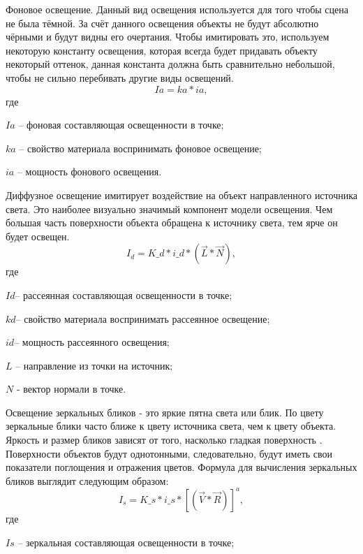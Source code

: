 \documentclass[a4paper,14pt]{report}
\begin{document}
Фоновое освещение. Данный вид освещения используется для того чтобы сцена не была тёмной. За счёт данного освещения объекты не будут абсолютно чёрными и будут видны его очертания. Чтобы имитировать это, используем некоторую константу освещения, которая всегда будет придавать объекту некоторый оттенок, данная константа должна быть сравнительно небольшой, чтобы не сильно перебивать другие виды освещений.
\begin{equation}
Ia = ka * ia ,
\label{eq4:ref}                  
\end{equation}                                             
где

$Ia$ – фоновая составляющая освещенности в точке;

$ka$ – свойство материала воспринимать фоновое освещение;

$ia$ – мощность фонового освещения.


Диффузное освещение имитирует воздействие на объект направленного источника света. Это наиболее визуально значимый компонент модели освещения. Чем большая часть поверхности объекта обращена к источнику света, тем ярче он будет освещен.
\begin{equation}
I_d=K\_d* i\_d*(\vec{L} * \vec{N}),  
\label{eq3:ref}                  
\end{equation}                                 
где

$Id$– рассеянная составляющая освещенности в точке;

$kd$– свойство материала воспринимать рассеянное освещение;

$id$– мощность рассеянного освещения;

$L$ – направление из точки на источник;

$N$ - вектор нормали в точке.


Освещение зеркальных бликов - это яркие пятна света или блик. По цвету зеркальные блики часто ближе к цвету источника света, чем к цвету объекта. Яркость и размер бликов зависят от того, насколько гладкая поверхность \cite{alg2}.
     Поверхности объектов будут однотонными, следовательно, будут иметь свои показатели поглощения и отражения цветов.
     Формула для вычисления зеркальных бликов выглядит следующим образом:
\begin{equation}
I_s=K\_s* i\_s*[(\vec{V} * \vec{R} )]^a, 
\label{eq2:ref}                  
\end{equation} 
 где

$Is$ – зеркальная составляющая освещенности в точке;
\end{document}
